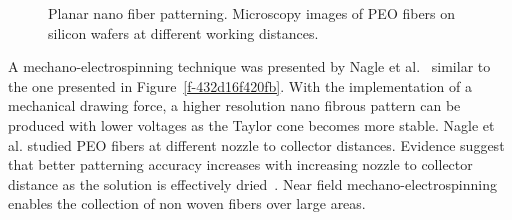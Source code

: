 \documentclass[5p,,preprint,12pt,twocolumn]{elsarticle}
\makeatletter
\def\fixFloatSize#1{}%
\makeatother
\begin{document}
\bgroup
\fixFloatSize{images/1847814e-ac17-4b33-ba90-6fe8b7336699-unagle_00.png}
\begin{figure}[!htbp]
\centering \makeatletter{}
\makeatother 
\caption{{Planar nano fiber patterning. Microscopy images of PEO fibers on silicon wafers at different working distances.}}
\label{f-f259e0a97fc2}
\end{figure}
\egroup
 A mechano-electrospinning technique was presented by Nagle et al.\unskip~\cite{527120:12033656} similar to the one presented in Figure~\ref{f-432d16f420fb}. With the implementation of a mechanical drawing force, a higher resolution nano fibrous pattern can be produced with lower voltages as the Taylor cone becomes more stable. Nagle et al. studied PEO fibers at different nozzle to collector distances. Evidence suggest that better patterning accuracy increases with increasing nozzle to collector distance as the solution is effectively dried\unskip~\cite{527120:12033656}. Near field mechano-electrospinning enables the collection of non woven fibers over large areas.
    
\end{document}
